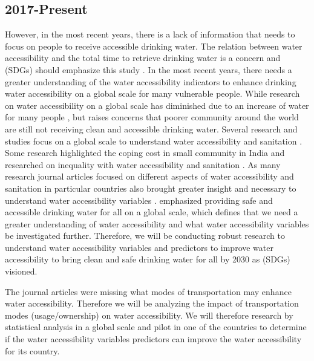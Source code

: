 \documentclass[10pt,twoside]{article}
\numberwithin{equation}{section}
\newcommand{\?}{\stackrel{?}{=}}
\begin{document}
\subsection{2017-Present}
However, in the most recent years, there is a lack of information that needs to focus on people to receive accessible drinking water. The relation between water accessibility and the total time to retrieve drinking water is a concern and (SDGs) should emphasize this study \citep{cassivi2018access}. In the most recent years, there needs a greater understanding of the water accessibility indicators to enhance drinking water accessibility on a global scale for many vulnerable people. While research on water accessibility on a global scale has diminished due to an increase of water for many people \citep{fullerTrackingProgressGlobal2016}, but \citet{deshpandeMappingGeographicalInequalities2020} raises concerns that poorer community around the world are still not receiving clean and accessible drinking water. Several research and studies focus on a global scale to understand water accessibility and sanitation \citep{cassiviAccessDrinkingWater2018, tortajadaAchievingUniversalAccess2018, priceDifferenceDayCan2019,deshpandeMappingGeographicalInequalities2020}. Some research highlighted the coping cost in small community in India \citep{amitMeasuringAffordabilityAccess2019} and researched on inequality with water accessibility and sanitation \citet{amitMeasuringAffordabilityAccess2019,priceDifferenceDayCan2019, rawasComparingUtilityreportedHours2020}. As many research journal articles focused on different aspects of water accessibility and sanitation in particular countries also brought greater insight and necessary to understand water accessibility variables \citep{rawasComparingUtilityreportedHours2020, cassiviEvaluatingSelfreportedMeasures2021, martinez-santos2017determinants}. \citet{GoalCleanWater} emphasized providing safe and accessible drinking water for all on a global scale, which defines that we need a greater understanding of water accessibility and what water accessibility variables be investigated further. Therefore, we will be conducting robust research to understand water accessibility variables and predictors to improve water accessibility to bring clean and safe drinking water for all by 2030 as (SDGs) visioned. 

The journal articles were missing what modes of transportation may enhance water accessibility. Therefore we will be analyzing the impact of transportation modes (usage/ownership) on water accessibility. We will therefore research by statistical analysis in a global scale and pilot in one of the countries to determine if the water accessibility variables predictors can improve the water accessibility for its country.
\eject
\end{document}
